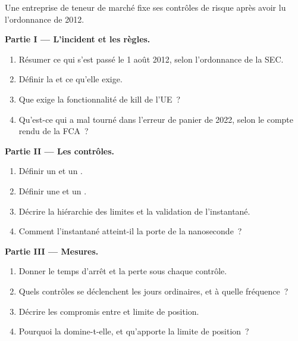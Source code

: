 \begin{problem}\label{pb:hf:risk-controls:1}
Une entreprise de teneur de marché fixe ses contrôles de risque après avoir lu l'ordonnance de 2012.

\medskip\noindent\textbf{Partie I --- L'incident et les règles.}
\begin{enumerate}
\item Résumer ce qui s'est passé le 1 août 2012, selon l'ordonnance de la SEC.
\item Définir la  et ce qu'elle exige.
\item Que exige la fonctionnalité de kill de l'UE~?
\item Qu'est-ce qui a mal tourné dans l'erreur de panier de 2022, selon le compte rendu de la FCA~?
\end{enumerate}

\medskip\noindent\textbf{Partie II --- Les contrôles.}
\begin{enumerate}[resume]
\item Définir un  et un .
\item Définir une  et un .
\item Décrire la hiérarchie des limites et la validation de l'instantané.
\item Comment l'instantané atteint-il la porte de la nanoseconde~?
\end{enumerate}

\medskip\noindent\textbf{Partie III --- Mesures.}
\begin{enumerate}[resume]
\item Donner le temps d'arrêt et la perte sous chaque contrôle.
\item Quels contrôles se déclenchent les jours ordinaires, et à quelle fréquence~?
\item Décrire les compromis entre  et limite de position.
\item Pourquoi la  domine-t-elle, et qu'apporte la limite de position~?
\end{enumerate}


\end{problem}
